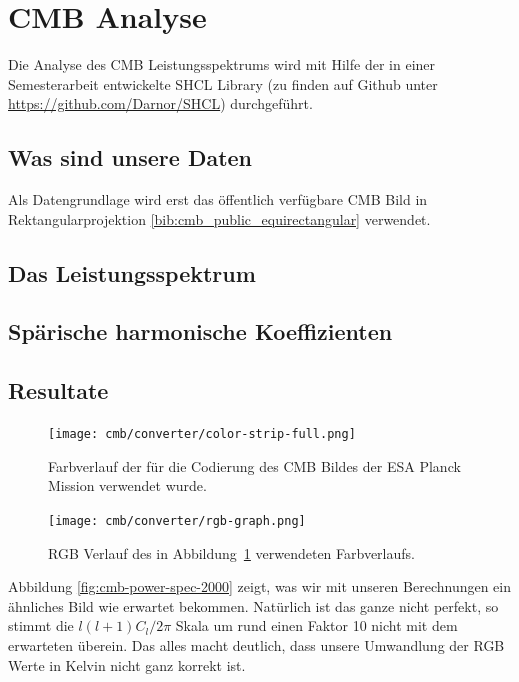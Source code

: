 \section{CMB Analyse}

Die Analyse des CMB Leistungsspektrums wird mit Hilfe der in einer 
Semesterarbeit entwickelte SHCL Library (zu finden auf Github unter 
\url{https://github.com/Darnor/SHCL}) durchgeführt.

\subsection{Was sind unsere Daten}
Als Datengrundlage wird erst das öffentlich verfügbare CMB Bild in 
Rektangularprojektion \ref{bib:cmb_public_equirectangular} verwendet.

\subsection{Das Leistungsspektrum}


\subsection{Spärische harmonische Koeffizienten}

\subsection{Resultate}

\begin{figure}
	\centering
	\texttt{[image: cmb/converter/color-strip-full.png]}
	\caption{Farbverlauf der für die Codierung des CMB Bildes der ESA Planck 
	Mission verwendet wurde.}
	\label{fig:color-strip-orig}
\end{figure}

\begin{figure}
	\centering
	\texttt{[image: cmb/converter/rgb-graph.png]}
	\caption{RGB Verlauf des in Abbildung~\ref{fig:color-strip-orig} 
	verwendeten Farbverlaufs.}
	\label{fig:color-strip-orig-rgb}
\end{figure}

Abbildung \ref{fig:cmb-power-spec-2000} zeigt, was wir mit unseren Berechnungen 
ein ähnliches Bild wie erwartet bekommen. Natürlich ist das ganze nicht 
perfekt, so stimmt die $l(l+1)C_l/2\pi$ Skala um rund einen Faktor 10 nicht mit 
dem erwarteten überein. Das alles macht deutlich, dass unsere Umwandlung der 
RGB Werte in Kelvin nicht ganz korrekt ist.

